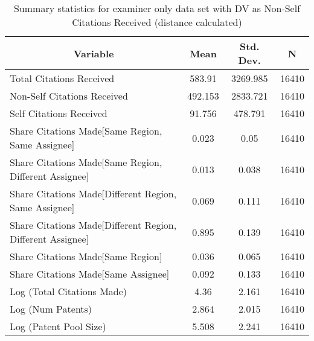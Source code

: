 
\begin{table}[htbp]\centering \caption{Summary statistics for examiner only data set with DV as Non-Self Citations Received (distance calculated) \label{e.nsummary}}
\scriptsize
\singlespacing
\begin{tabular}{l c c  c}\hline\hline
\multicolumn{1}{c}{\textbf{Variable}} & \textbf{Mean}
 & \textbf{Std. Dev.} & \textbf{N}\\ \hline
Total Citations Received & 583.91 & 3269.985  & 16410\\
Non-Self Citations Received & 492.153 & 2833.721  & 16410\\
Self Citations Received & 91.756 & 478.791  & 16410\\
Share Citations Made[Same Region, Same Assignee] & 0.023 & 0.05  & 16410\\
Share Citations Made[Same Region, Different Assignee] & 0.013 & 0.038  & 16410\\
Share Citations Made[Different Region, Same Assignee] & 0.069 & 0.111  & 16410\\
Share Citations Made[Different Region, Different Assignee] & 0.895 & 0.139  & 16410\\
Share Citations Made[Same Region] & 0.036 & 0.065  & 16410\\
Share Citations Made[Same Assignee] & 0.092 & 0.133  & 16410\\
Log (Total Citations Made) & 4.36 & 2.161  & 16410\\
Log (Num Patents) & 2.864 & 2.015  & 16410\\
Log (Patent Pool Size) & 5.508 & 2.241  & 16410\\
\hline\end{tabular}
\end{table}

